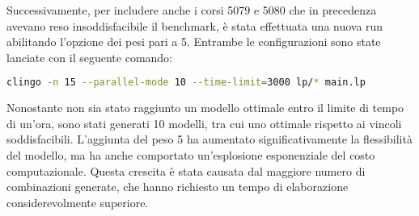 Successivamente, per includere anche i corsi 5079 e 5080 che in precedenza avevano reso 
insoddisfacibile il benchmark, è stata effettuata una nuova run abilitando l’opzione dei 
pesi pari a 5. Entrambe le configurazioni sono state lanciate con il seguente comando:

\begin{lstlisting}[language=bash]
 clingo -n 15 --parallel-mode 10 --time-limit=3000 lp/* main.lp
\end{lstlisting}

Nonostante non sia stato raggiunto un modello ottimale entro il limite di tempo di un'ora, 
sono stati generati 10 modelli, tra cui uno ottimale rispetto ai vincoli soddisfacibili. 
L'aggiunta del peso 5 ha aumentato significativamente la flessibilità del modello, ma ha 
anche comportato un'esplosione esponenziale del costo computazionale. Questa crescita è 
stata causata dal maggiore numero di combinazioni generate, che hanno richiesto un tempo di 
elaborazione considerevolmente superiore.
